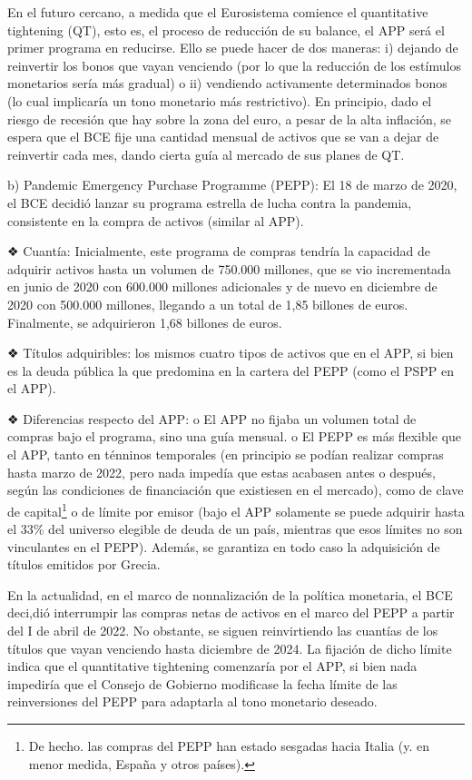 \documentclass[10pt,a4paper]{article}
\begin{document}
{En el futuro cercano, a medida que el Eurosistema comience el quantitative tightening (QT), esto es, el proceso de reducción de su balance, el APP será el primer programa en reducirse. Ello se puede hacer de dos maneras: i) dejando de reinvertir los bonos que vayan venciendo (por lo que la reducción de los estímulos monetarios sería más gradual) o ii) vendiendo activamente determinados bonos (lo cual implicaría un tono monetario más restrictivo). En principio, dado el riesgo de recesión que hay sobre la zona del euro, a pesar de la alta inflación, se espera que el BCE fije una cantidad mensual de activos que se van a dejar de reinvertir cada mes, dando cierta guía al mercado de sus planes de QT. 


b) Pandemic Emergency Purchase Programme (PEPP): El 18 de marzo de 2020, el BCE decidió lanzar su programa estrella de lucha contra la pandemia, consistente en la compra de activos (similar al APP).

❖ Cuantía: Inicialmente, este programa de compras tendría la capacidad de adquirir activos hasta un volumen de 750.000 millones, que se vio incrementada en junio de 2020 con 600.000 millones adicionales y de nuevo en diciembre de 2020 con 500.000 millones, llegando a un total de 1,85 billones de euros. Finalmente, se adquirieron 1,68 billones de euros.

❖ Títulos adquiribles: los mismos cuatro tipos de activos que en el APP, si bien es la deuda pública la que predomina en la cartera del PEPP (como el PSPP en el APP).

❖ Diferencias respecto del APP: o El APP no fijaba un volumen total de compras bajo el programa, sino una guía mensual. o El PEPP es más flexible que el APP, tanto en ténninos temporales (en principio se podían realizar compras hasta marzo de 2022, pero nada impedía que estas acabasen antes o después, según las condiciones de financiación que existiesen en el mercado), como de clave de capital\footnote{%
    De hecho. las compras del PEPP han estado sesgadas hacia Italia (y. en menor medida, España y otros países).
} o de límite por emisor (bajo el APP solamente se puede adquirir hasta el 33\% del universo elegible de deuda de un país, mientras que esos límites no son vinculantes en el PEPP). Además, se garantiza en todo caso la adquisición de títulos emitidos por Grecia.

En la actualidad, en el marco de nonnalización de la política monetaria, el BCE deci,dió interrumpir las compras netas de activos en el marco del PEPP a partir del I de abril de 2022. No obstante, se siguen reinvirtiendo las cuantías de los títulos que vayan venciendo hasta diciembre de 2024. La fijación de dicho límite indica que el quantitative tightening comenzaría por el APP, si bien nada impediría que el Consejo de Gobierno modificase la fecha límite de las reinversiones del PEPP para adaptarla al tono monetario deseado. 

}
\end{document}
